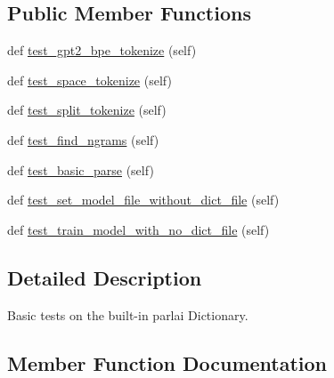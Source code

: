 \subsection*{Public Member Functions}
\begin{DoxyCompactItemize}
\item 
def \hyperlink{classtests_1_1test__dict_1_1TestDictionary_a9109b6c1bf1f0e7adfdd3fc4dc1ead74}{test\+\_\+gpt2\+\_\+bpe\+\_\+tokenize} (self)
\item 
def \hyperlink{classtests_1_1test__dict_1_1TestDictionary_aa586d6cf97a48027ee00ed74234acb11}{test\+\_\+space\+\_\+tokenize} (self)
\item 
def \hyperlink{classtests_1_1test__dict_1_1TestDictionary_aa10a7901ffa04a2d0ba43b43b0a18f26}{test\+\_\+split\+\_\+tokenize} (self)
\item 
def \hyperlink{classtests_1_1test__dict_1_1TestDictionary_ae017e72c578005310906979e15c51fe4}{test\+\_\+find\+\_\+ngrams} (self)
\item 
def \hyperlink{classtests_1_1test__dict_1_1TestDictionary_a864b582dad32c539b4499f521c9afb3f}{test\+\_\+basic\+\_\+parse} (self)
\item 
def \hyperlink{classtests_1_1test__dict_1_1TestDictionary_a6c7dcec12a72ba52852f7b214d4783bf}{test\+\_\+set\+\_\+model\+\_\+file\+\_\+without\+\_\+dict\+\_\+file} (self)
\item 
def \hyperlink{classtests_1_1test__dict_1_1TestDictionary_a33993874a2fa2dc57b3936479b17aae1}{test\+\_\+train\+\_\+model\+\_\+with\+\_\+no\+\_\+dict\+\_\+file} (self)
\end{DoxyCompactItemize}


\subsection{Detailed Description}
\begin{DoxyVerb}Basic tests on the built-in parlai Dictionary.
\end{DoxyVerb}
 

\subsection{Member Function Documentation}
\mbox{\label{classtests_1_1test__dict_1_1TestDictionary_a864b582dad32c539b4499f521c9afb3f}} 
